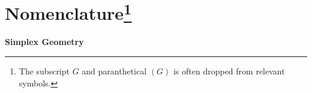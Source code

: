 \chapter*{Nomenclature\footnote{The subscript $G$ and paranthetical $(G)$ is often dropped from relevant symbols.}}

\newlength{\colwidth} %
\newlength{\groupsep} %
\newlength{\headingsep} %
\newlength{\descsep} %
\setlength{\colwidth}{3.5cm}
\setlength{\groupsep}{1cm}
\setlength{\headingsep}{0.00cm}
\setlength{\descsep}{8cm}

\textbf{Simplex Geometry}\\
\vspace{\headingsep}
